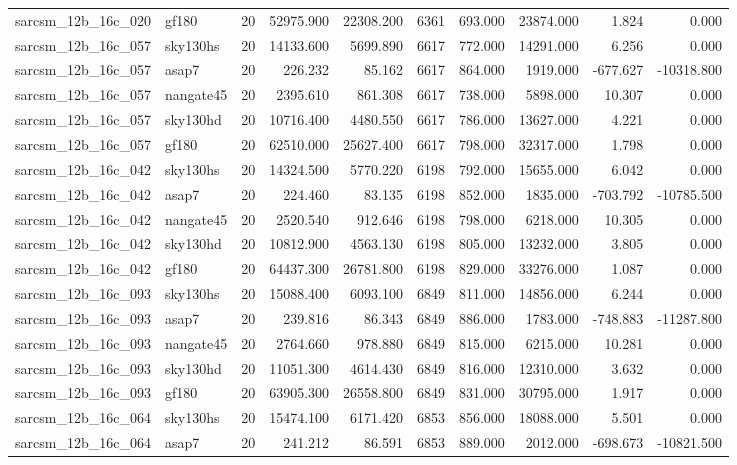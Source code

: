\documentclass{article}
\begin{document}
\begin{longtable}{llrrrrrrrr}
sarcsm\_12b\_16c\_020 & gf180 & 20 & 52975.900 & 22308.200 & 6361 & 693.000 & 23874.000 & 1.824 & 0.000 \\
sarcsm\_12b\_16c\_057 & sky130hs & 20 & 14133.600 & 5699.890 & 6617 & 772.000 & 14291.000 & 6.256 & 0.000 \\
sarcsm\_12b\_16c\_057 & asap7 & 20 & 226.232 & 85.162 & 6617 & 864.000 & 1919.000 & -677.627 & -10318.800 \\
sarcsm\_12b\_16c\_057 & nangate45 & 20 & 2395.610 & 861.308 & 6617 & 738.000 & 5898.000 & 10.307 & 0.000 \\
sarcsm\_12b\_16c\_057 & sky130hd & 20 & 10716.400 & 4480.550 & 6617 & 786.000 & 13627.000 & 4.221 & 0.000 \\
sarcsm\_12b\_16c\_057 & gf180 & 20 & 62510.000 & 25627.400 & 6617 & 798.000 & 32317.000 & 1.798 & 0.000 \\
sarcsm\_12b\_16c\_042 & sky130hs & 20 & 14324.500 & 5770.220 & 6198 & 792.000 & 15655.000 & 6.042 & 0.000 \\
sarcsm\_12b\_16c\_042 & asap7 & 20 & 224.460 & 83.135 & 6198 & 852.000 & 1835.000 & -703.792 & -10785.500 \\
sarcsm\_12b\_16c\_042 & nangate45 & 20 & 2520.540 & 912.646 & 6198 & 798.000 & 6218.000 & 10.305 & 0.000 \\
sarcsm\_12b\_16c\_042 & sky130hd & 20 & 10812.900 & 4563.130 & 6198 & 805.000 & 13232.000 & 3.805 & 0.000 \\
sarcsm\_12b\_16c\_042 & gf180 & 20 & 64437.300 & 26781.800 & 6198 & 829.000 & 33276.000 & 1.087 & 0.000 \\
sarcsm\_12b\_16c\_093 & sky130hs & 20 & 15088.400 & 6093.100 & 6849 & 811.000 & 14856.000 & 6.244 & 0.000 \\
sarcsm\_12b\_16c\_093 & asap7 & 20 & 239.816 & 86.343 & 6849 & 886.000 & 1783.000 & -748.883 & -11287.800 \\
sarcsm\_12b\_16c\_093 & nangate45 & 20 & 2764.660 & 978.880 & 6849 & 815.000 & 6215.000 & 10.281 & 0.000 \\
sarcsm\_12b\_16c\_093 & sky130hd & 20 & 11051.300 & 4614.430 & 6849 & 816.000 & 12310.000 & 3.632 & 0.000 \\
sarcsm\_12b\_16c\_093 & gf180 & 20 & 63905.300 & 26558.800 & 6849 & 831.000 & 30795.000 & 1.917 & 0.000 \\
sarcsm\_12b\_16c\_064 & sky130hs & 20 & 15474.100 & 6171.420 & 6853 & 856.000 & 18088.000 & 5.501 & 0.000 \\
sarcsm\_12b\_16c\_064 & asap7 & 20 & 241.212 & 86.591 & 6853 & 889.000 & 2012.000 & -698.673 & -10821.500 \\

\end{longtable}
\end{document}
